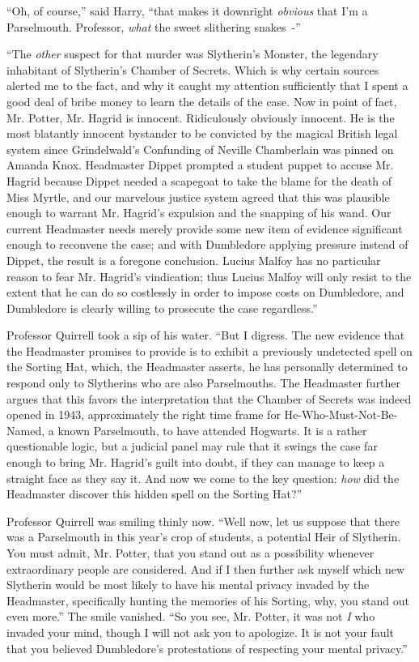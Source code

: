 ``Oh, of course,'' said Harry, ``that makes it downright \emph{obvious} that I'm a Parselmouth. Professor, \emph{what} the sweet slithering snakes~-''

``The \emph{other} suspect for that murder was Slytherin's Monster, the legendary inhabitant of Slytherin's Chamber of Secrets. Which is why certain sources alerted me to the fact, and why it caught my attention sufficiently that I spent a good deal of bribe money to learn the details of the case. Now in point of fact, Mr. Potter, Mr. Hagrid is innocent. Ridiculously obviously innocent. He is the most blatantly innocent bystander to be convicted by the magical British legal system since Grindelwald's Confunding of Neville Chamberlain was pinned on Amanda Knox. Headmaster Dippet prompted a student puppet to accuse Mr. Hagrid because Dippet needed a scapegoat to take the blame for the death of Miss Myrtle, and our marvelous justice system agreed that this was plausible enough to warrant Mr. Hagrid's expulsion and the snapping of his wand. Our current Headmaster needs merely provide some new item of evidence significant enough to reconvene the case; and with Dumbledore applying pressure instead of Dippet, the result is a foregone conclusion. Lucius Malfoy has no particular reason to fear Mr. Hagrid's vindication; thus Lucius Malfoy will only resist to the extent that he can do so costlessly in order to impose costs on Dumbledore, and Dumbledore is clearly willing to prosecute the case regardless.''

Professor Quirrell took a sip of his water. ``But I digress. The new evidence that the Headmaster promises to provide is to exhibit a previously undetected spell on the Sorting Hat, which, the Headmaster asserts, he has personally determined to respond only to Slytherins who are also Parselmouths. The Headmaster further argues that this favors the interpretation that the Chamber of Secrets was indeed opened in 1943, approximately the right time frame for He-Who-Must-Not-Be-Named, a known Parselmouth, to have attended Hogwarts. It is a rather questionable logic, but a judicial panel may rule that it swings the case far enough to bring Mr. Hagrid's guilt into doubt, if they can manage to keep a straight face as they say it. And now we come to the key question: \emph{how} did the Headmaster discover this hidden spell on the Sorting Hat?''

Professor Quirrell was smiling thinly now. ``Well now, let us suppose that there was a Parselmouth in this year's crop of students, a potential Heir of Slytherin. You must admit, Mr. Potter, that you stand out as a possibility whenever extraordinary people are considered. And if I then further ask myself which new Slytherin would be most likely to have his mental privacy invaded by the Headmaster, specifically hunting the memories of his Sorting, why, you stand out even more.'' The smile vanished. ``So you see, Mr. Potter, it was not \emph{I} who invaded your mind, though I will not ask you to apologize. It is not your fault that you believed Dumbledore's protestations of respecting your mental privacy.''

